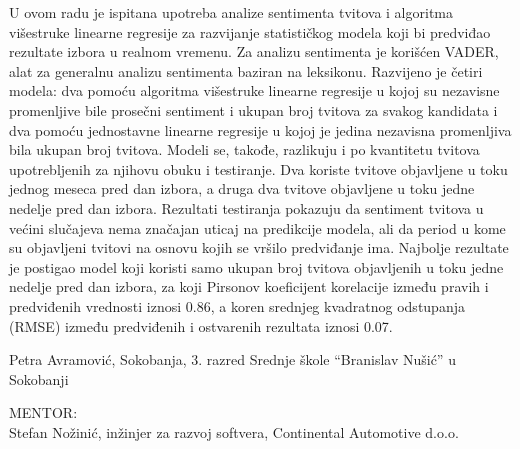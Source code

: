 \begin{Abstract}
U ovom radu je ispitana upotreba analize sentimenta tvitova i algoritma višestruke linearne regresije za razvijanje statističkog modela koji bi predviđao rezultate izbora u realnom vremenu. Za analizu sentimenta je korišćen VADER, alat za generalnu analizu sentimenta baziran na leksikonu. Razvijeno je četiri modela: dva pomoću algoritma višestruke linearne regresije u kojoj su nezavisne promenljive bile prosečni sentiment i ukupan broj tvitova za svakog kandidata i dva pomoću jednostavne linearne regresije u kojoj je jedina nezavisna promenljiva bila ukupan broj tvitova. Modeli se, takođe, razlikuju i po kvantitetu tvitova upotrebljenih za njihovu obuku i testiranje. Dva koriste tvitove objavljene u toku jednog meseca pred dan izbora, a druga dva tvitove objavljene u toku jedne nedelje pred dan izbora. Rezultati testiranja pokazuju da sentiment tvitova u većini slučajeva nema značajan uticaj na predikcije modela, ali da period u kome su objavljeni tvitovi na osnovu kojih se vršilo predviđanje ima. Najbolje rezultate je postigao model koji koristi samo ukupan broj tvitova objavljenih u toku jedne nedelje pred dan izbora, za koji Pirsonov koeficijent korelacije između pravih i predviđenih vrednosti iznosi 0.86, a koren srednjeg kvadratnog odstupanja (RMSE) između predviđenih i ostvarenih rezultata iznosi 0.07.
\end{Abstract}
\begin{AuthorEx}
Petra Avramović, Sokobanja, 3. razred Srednje škole “Branislav Nušić” u Sokobanji

MENTOR:\\
Stefan Nožinić, inžinjer za razvoj softvera, Continental Automotive d.o.o.
\end{AuthorEx}
